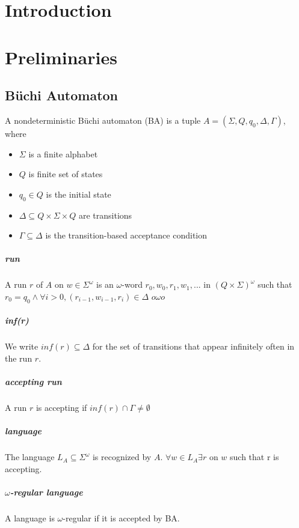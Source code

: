 \documentclass{fithesis3}
\begin{document}
	\chapter{Introduction}
	\chapter{Preliminaries}
		\section{Büchi Automaton}
		A nondeterministic Büchi automaton (BA) is a tuple 
		$A=(\Sigma, Q, q_0, \Delta, \Gamma)$,
		where
		\begin{itemize}
			\item $\Sigma$ is a finite alphabet
			\item $Q$ is finite set of states
			\item $q_0 \in Q$ is the initial state
			\item $\Delta \subseteq Q \times \Sigma \times Q$
			are transitions
			\item $\Gamma \subseteq \Delta$
			is the transition-based acceptance condition
		\end{itemize} 
		\paragraph{run}
		A run $r$ of $A$ on $w \in \Sigma^\omega$
		is an $\omega$-word $r_0, w_0, r_1, w_1,...$ in $(Q\times\Sigma)^\omega$
		such that $r_0 = q_0 \land\forall i>0, (r_{i-1}, w_{i-1}, r_i) \in \Delta$ $o\omega o$
		\paragraph{inf(r)}
		We write $inf(r) \subseteq \Delta$ for the set of transitions that appear infinitely often in the run $r$.
		\paragraph{accepting run} A run $r$ is accepting if $inf(r) \cap \Gamma \neq \emptyset$
		\paragraph{language}
		The language $L_A\subseteq\Sigma^\omega$ is recognized by $A$.\newline
		$\forall w \in L_A \exists r$ on $w$ such that r is accepting.
		\paragraph{$\omega$-regular language}
		A language is $\omega$-regular if it is accepted by BA.
\end{document}
